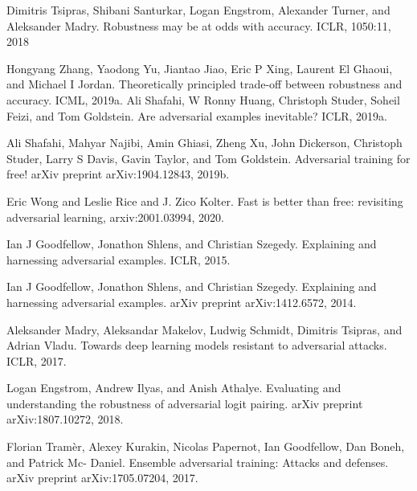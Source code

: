 \documentclass{article}
\begin{document}
\begin{thebibliography}{100} 
	 {Dimitris Tsipras, Shibani Santurkar, Logan Engstrom, Alexander Turner, and Aleksander Madry. Robustness may be at odds with accuracy. ICLR, 1050:11, 2018}

	 {Hongyang Zhang, Yaodong Yu, Jiantao Jiao, Eric P Xing, Laurent El Ghaoui, and Michael I Jordan. Theoretically principled trade-off between robustness and accuracy. ICML, 2019a.}
	 {Ali Shafahi, W Ronny Huang, Christoph Studer, Soheil Feizi, and Tom Goldstein. Are adversarial examples inevitable? ICLR, 2019a.}
	
	 {Ali Shafahi, Mahyar Najibi, Amin Ghiasi, Zheng Xu, John Dickerson, Christoph Studer, Larry S
		Davis, Gavin Taylor, and Tom Goldstein. Adversarial training for free!
		arXiv preprint
		arXiv:1904.12843, 2019b.}
	
	 {Eric Wong and Leslie Rice and J. Zico Kolter. Fast is better than free: revisiting adversarial learning, arxiv:2001.03994, 2020.}
	
	 {Ian J Goodfellow, Jonathon Shlens, and Christian Szegedy. Explaining and harnessing adversarial examples. ICLR, 2015.}
	
	 {Ian J Goodfellow, Jonathon Shlens, and Christian Szegedy. Explaining and harnessing adversarial examples. arXiv preprint arXiv:1412.6572, 2014.}
	
	 {Aleksander Madry, Aleksandar Makelov, Ludwig Schmidt, Dimitris Tsipras, and Adrian Vladu. Towards deep learning models resistant to adversarial attacks. ICLR, 2017.}
	
	 {Logan Engstrom, Andrew Ilyas, and Anish Athalye. Evaluating and understanding the robustness of adversarial logit pairing. arXiv preprint arXiv:1807.10272, 2018.}
	
	 {Florian Tramèr, Alexey Kurakin, Nicolas Papernot, Ian Goodfellow, Dan Boneh, and Patrick Mc-
		Daniel. Ensemble adversarial training: Attacks and defenses. arXiv preprint arXiv:1705.07204,
		2017.}
	
\end{thebibliography}
	
\end{document}
